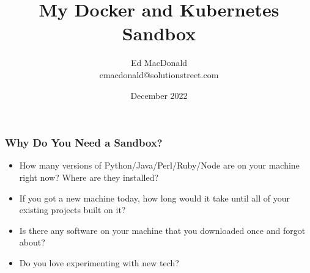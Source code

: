 
\usepackage[utf8]{inputenc}
\usepackage{minted}
\usepackage{listings}
\usepackage{graphicx}
\usepackage{xcolor}
\usepackage{adjustbox}


\hypersetup{colorlinks,linkcolor=,urlcolor=links}

\setlength{\columnseprule}{0.4pt}


\title[Sandbox]{My Docker and Kubernetes Sandbox}
\author[Ed MacDonald]{Ed MacDonald\\emacdonald@solutionstreet.com}
\date{December 2022}





    \frame{\titlepage}

    \begin{frame}
      \frametitle{Why Do You Need a Sandbox?}
      \begin{itemize}
      \item<2->How many versions of Python/Java/Perl/Ruby/Node are on your
        machine right now? Where are they installed?
      \item<3->If you got a new machine today, how long would it take until all
        of your existing projects built on it?
      \item<4->Is there any software on your machine that you downloaded once and forgot about?
      \item<5->Do you love experimenting with new tech?
      \end{itemize}
    \end{frame}

